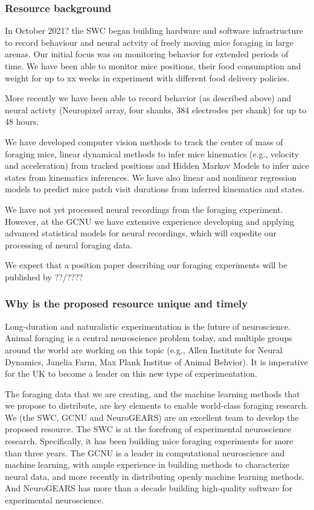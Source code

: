 \subsubsection*{Resource background}

In October 2021? the SWC began building hardware and software infrastructure to
record behaviour and neural actvity of freely moving mice foraging in large
arenas. Our initial focus was on monitoring behavior for extended periods of
time. We have been able to monitor mice positions, their food consumption and
weight for up to xx weeks in experiment with different food delivery policies.

More recently we have been able to record behavior (as described above) and
neural activty (Neuropixel array, four shanks, 384 electrodes per shank) for up
to 48 hours.

We have developed computer vision methods to track the center of mass of
foraging mice, linear dynamical methods to infer mice kinematics (e.g.,
velocity and acceleration) from tracked positions and Hidden Markov Models to
infer mice states from kinematics inferences.
%
We have also linear and nonlinear regression models to predict mice patch
visit durations from inferred kinematics and states.

We have not yet processed neural recordings from the foraging experiment.
However, at the GCNU we have extensive experience developing and applying
advanced statistical models for neural recordings, which will expedite our
processing of neural foraging data.

We expect that a position paper describing our foraging experiments will be
published by ??/????

\subsubsection*{Why is the proposed resource unique and timely}


Long-duration and naturalistic
experimentation is the future of neuroscience. Animal foraging is a central
neuroscience problem today, and multiple groups around the world are working on
this topic (e.g., Allen Institute for Neural Dynamics, Janelia Farm, Max Plank
Institue of Animal Behvior). It is imperative for the UK to become a leader on
this new type of experimentation.

The foraging data that we are creating, and the machine learning methods that
we propose to distribute, are key elements to enable world-class foraging
research.
%
We (the SWC, GCNU and NeuroGEARS) are an excellent team to develop the proposed resource.
The SWC is at the forefrong of experimental neuroscience research.
Specifically, it has been building mice foraging experiments for more than three years.
The GCNU is a leader in computational neuroscience and machine learning, with ample experience in
building methods to characterize neural data, and more recently
in distributing openly machine learning methods. And NeuroGEARS has more than a
decade building high-quality software for experimental neuroscience.

